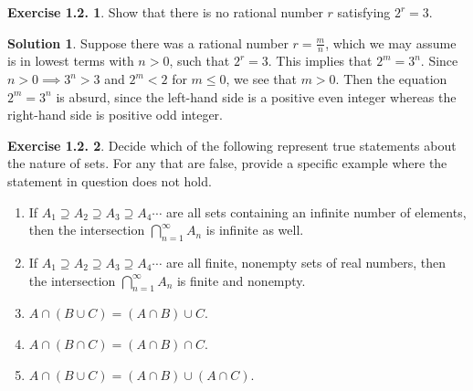 \documentclass[12pt]{article}
\theoremstyle{definition}
\theoremstyle{exercise}
\newtheorem{exercise}{Exercise 1.2.}
\theoremstyle{solution}
\newtheorem*{solution}{Solution}
\begin{document}
\begin{exercise}
\label{ex:2}
    Show that there is no rational number \( r \) satisfying \( 2^r = 3 \).
\end{exercise}

\begin{solution}
    Suppose there was a rational number \( r = \tfrac{m}{n} \), which we may assume is in lowest terms with \( n > 0 \), such that \( 2^r = 3 \). This implies that \( 2^m = 3^n \). Since \( n > 0 \implies 3^n > 3 \) and \( 2^m < 2 \) for \( m \leq 0 \), we see that \( m > 0 \). Then the equation \( 2^m = 3^n \) is absurd, since the left-hand side is a positive even integer whereas the right-hand side is positive odd integer.
\end{solution}

\begin{exercise}
\label{ex:3}
    Decide which of the following represent true statements about the nature of sets. For any that are false, provide a specific example where the statement in question does not hold.
    \begin{enumerate}[label = (\alph*)]
        \item If \( A_1 \supseteq A_2 \supseteq A_3 \supseteq A_4 \cdots \) are all sets containing an infinite number of elements, then the intersection \( \bigcap_{n=1}^{\infty} A_n \) is infinite as well.

        \item If \( A_1 \supseteq A_2 \supseteq A_3 \supseteq A_4 \cdots \) are all finite, nonempty sets of real numbers, then the intersection \( \bigcap_{n=1}^{\infty} A_n \) is finite and nonempty.

        \item \( A \cap (B \cup C) = (A \cap B) \cup C \).

        \item \( A \cap (B \cap C) = (A \cap B) \cap C \).

        \item \( A \cap (B \cup C) = (A \cap B) \cup (A \cap C) \).
    \end{enumerate}
\end{exercise}
\end{document}
